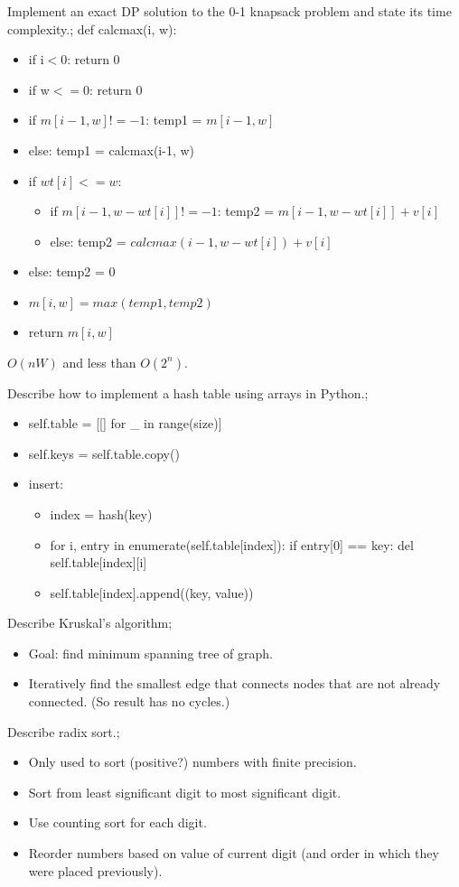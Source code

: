\documentclass{article}
\begin{document}
Implement an exact DP solution  to the 0-1 knapsack problem and state its time complexity.; def calcmax(i, w): \begin{itemize} \item if i$<$0: return 0 \item if w$<=$0: return 0 \item if $m[i-1,w] != -1$: temp1 = $m[i-1,w]$ \item else: temp1 = calcmax(i-1, w) \item if $wt[i] <= w$: \begin{itemize} \item if $m[i-1,w-wt[i]] != -1$: temp2 = $m[i-1, w-wt[i]] + v[i]$ \item else: temp2 = $calcmax(i-1, w-wt[i]) + v[i]$ \end{itemize} \item else: temp2 = 0 \item $m[i,w]=max(temp1, temp2)$ \item return $m[i,w]$ \end{itemize} $O(nW)$ and less than $O(2^n)$.

Describe how to implement a hash table using arrays in Python.; \begin{itemize} \item self.table = [[] for \_ in range(size)] \item self.keys = self.table.copy() \item insert: \begin{itemize} \item index = hash(key) \item for i, entry in enumerate(self.table[index]): if entry[0] == key: del self.table[index][i] \item self.table[index].append((key, value)) \end{itemize} \end{itemize}

Describe Kruskal's algorithm; \begin{itemize} \item Goal: find minimum spanning tree of graph. \item Iteratively find the smallest edge that connects nodes that are not already connected. (So result has no cycles.) \end{itemize}

Describe radix sort.; \begin{itemize}
    \item Only used to sort (positive?) numbers with finite precision.
    \item Sort from least significant digit to most significant digit.
    \item Use counting sort for each digit.
    \item Reorder numbers based on value of current digit (and order in which they were placed previously).
\end{itemize}
\end{document}
